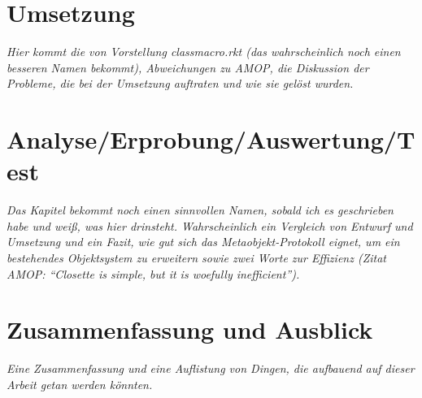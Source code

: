 
\pagestyle{diplHeadings}





\setcounter{page}{1}
\tableofcontents
\cleardoublepage 

\setcounter{page}{1} 
\mainmatter  
{}

 

 





\chapter{Umsetzung}  
\label{implementation}
\textit{Hier kommt die von Vorstellung classmacro.rkt (das wahrscheinlich noch einen besseren Namen bekommt), Abweichungen zu AMOP, die Diskussion der Probleme, die bei der Umsetzung auftraten und wie sie gelöst wurden.}

\chapter{Analyse/Erprobung/Auswertung/Test}
\textit{Das Kapitel bekommt noch einen sinnvollen Namen, sobald ich es geschrieben habe und weiß, was hier drinsteht. Wahrscheinlich ein Vergleich von Entwurf und Umsetzung und ein Fazit, wie gut sich das Metaobjekt-Protokoll eignet, um ein bestehendes Objektsystem zu erweitern sowie zwei Worte zur Effizienz (Zitat AMOP: ``Closette is simple, but it is woefully inefficient'').}

\chapter{Zusammenfassung und Ausblick}
\textit{Eine Zusammenfassung und eine Auflistung von Dingen, die aufbauend auf dieser Arbeit getan werden könnten.}

\cleardoublepage
{}
{}

  
\cleardoublepage


\cleardoublepage




